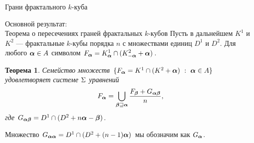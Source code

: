 \documentclass[aspectratio=1610, 10pt, notheorems]{beamer}
\newtheorem{theorem}     {Теорема}
\newtheorem{proposition} {Предложение}
\newtheorem{definition}  {Определение}
\begin{document}
\begin{frame}{Грани фрактального $k$-куба}
\end{frame}


\begin{frame}{Основной результат:\\Теорема о пересечениях граней фрактальных $k$-кубов }
Пусть в дальнейшем $K^1$ и $K^2$ --- фрактальные $k$-кубы порядка $n$ с множествами единиц $D^1$ и $D^2$.
Для любого ${\bm{\alpha}}\in A$ символом $F_{\bm{\alpha}}=K^1_{\bm{\alpha}}\cap(K^2_{-{\bm{\alpha}}}+{\bm{\alpha}})$.

\begin{theorem}\label{IFC}
Семейство множеств $\{F_{\bm{\alpha}}=K^1\cap(K^2+{\bm{\alpha}})\ :\ {\bm{\alpha}}\in A\}$ удовлетворяет системе $\Sigma$ уравнений 
\begin{equation}\label{sideint}
F_{\bm{\alpha}}=\bigcup\limits_{{\bm{\beta}}\sqsupseteq{\bm{\alpha}}} 
\dfrac{F_{\bm{\beta}}+G_{{\bm{\alpha}}{\bm{\beta}}}}{n},
\end{equation}
где $G_{{\bm{\alpha}}{\bm{\beta}}}=D^1\cap(D^2+n{\bm{\alpha}}-{\bm{\beta}})$.
\end{theorem}
Множество $G_{{\bm{\alpha}}{\bm{\alpha}}}=D^1\cap(D^2+(n-1){\bm{\alpha}})$ мы обозначим как $G_{{\bm{\alpha}}}$.
\end{frame}
\end{document}
